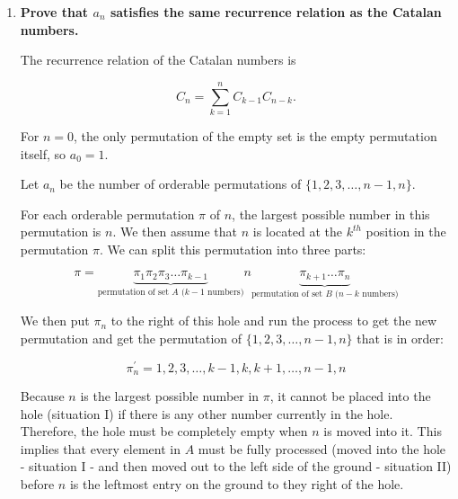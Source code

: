 \documentclass[10pt]{article}
\begin{document}
\begin{enumerate}
\begin{enumerate}
\begin{itemize}
\begin{itemize}
\begin{align*}
\begin{tabular}{|c|c|c|c|c|}
                             \hline
                             4& \text{III} & 1 & 23  & \\
                             \hline
                             5& \text{III} & 12 & 3 & \\
                             \hline
                             6& \text{III} & 123 &  & \\
                             \hline
                        \end{tabular}
                    \end{align*}
            \end{itemize}
            Therefore, $a_3 = 5$.
    \end{itemize}

	\item
	\textbf{Prove that $a_n$ satisfies the same recurrence relation as the Catalan numbers.}

    The recurrence relation of the Catalan numbers is

    $$C_n = \sum_{k=1}^nC_{k-1}C_{n-k}.$$

    For $n=0$, the only permutation of the empty set is the empty permutation itself, so $a_0 = 1$. 

    Let $a_n$ be the number of orderable permutations of $\{1,2,3,\ldots,n-1,n\}$.
    
    For each orderable permutation $\pi$ of $n$, the largest possible number in this permutation is $n$. We then assume that $n$ is located at the $k^{th}$ position in the permutation $\pi$. We can split this permutation into three parts:

    $$\pi = \underbrace{\pi_1\pi_2\pi_3\ldots \pi_{k-1}}_{\text{permutation of set $A$ ($k-1$ numbers)}}n \underbrace{\pi_{k+1}\ldots \pi_n}_{\text{permutation of set $B$ ($n-k$ numbers)}}$$

    We then put $\pi_n$ to the right of this hole and run the process to get the new permutation and get the permutation of $\{1,2,3,\ldots,n-1,n\}$ that is in order:

    $$\pi^{'}_{n} = 1,2,3,\dots,k-1, k,k+1,\ldots, n-1,n$$
    
    Because $n$ is the largest possible number in $\pi$, it cannot be placed into the hole (situation I) if there is any other number currently in the hole. Therefore, the hole must be completely empty when $n$ is moved into it. This implies that every element in $A$ must be fully processed (moved into the hole - situation I - and then moved out to the left side of the ground - situation II) before $n$ is the leftmost entry on the ground to they right of the hole. 


\end{enumerate}
\end{enumerate}
\end{document}
